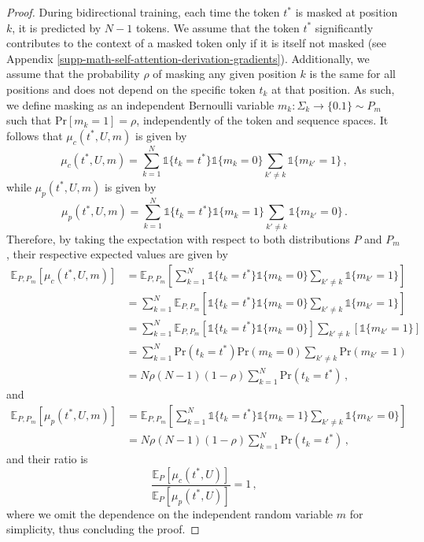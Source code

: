 \begin{proof}
During bidirectional training, each time the token $t^*$ is masked at position $k$, it is predicted by $N-1$ tokens.
%
We assume that the token $t^*$ significantly contributes to the context of a masked token only if it is itself not masked (see Appendix \ref{supp-math-self-attention-derivation-gradients}).
%
Additionally, we assume that the probability $\rho$ of masking any given position $k$ is the same for all positions and does not depend on the specific token $t_k$ at that position.
%
As such, we define masking as an independent Bernoulli variable $m_k: \Sigma_k \rightarrow \{0.1\} \sim P_m$ such that $\text{Pr}[m_k = 1] = \rho$, independently of the token and sequence spaces.
%
It follows that $\mu_c(t^*, U, m)$ is given by 
%
\begin{equation}
\mu_c(t^*, U, m) = \sum_{k=1}^N\mathds{1}\{t_k = t^*\} \mathds{1}\{m_k = 0\}\sum_{k' \neq k} \mathds{1}\{m_{k'} = 1\}  \,,
\end{equation}
%
while $\mu_p(t^*, U, m)$ is given by 
%
\begin{equation}
\mu_p(t^*, U, m) = \sum_{k=1}^N\mathds{1}\{t_k = t^*\} \mathds{1}\{m_{k} = 1\}\sum_{k' \neq k} \mathds{1}\{m_{k'} = 0\}\,.
\end{equation}
%
Therefore, by taking the expectation with respect to both distributions \( P \) and \( P_m \), their respective expected values are given by
%
\begin{equation}
\begin{split}
\mathbb{E}_{P,P_m}[\mu_c(t^*, U, m)] 
& =  \mathbb{E}_{P,P_m} \left[\sum_{k=1}^N\mathds{1}\{t_k = t^*\} \mathds{1}\{m_{k} = 0\}\sum_{k' \neq k} \mathds{1}\{m_{k'} = 1\} \right] \\
& = \sum_{k=1}^N \mathbb{E}_{P,P_m} \left[\mathds{1}\{t_k = t^*\} \mathds{1}\{m_{k} = 0\}\sum_{k' \neq k} \mathds{1}\{m_{k'} = 1\} \right]\\
& = \sum_{k=1}^N \mathbb{E}_{P,P_m} \left[\mathds{1}\{t_k = t^*\} \mathds{1}\{m_{k} = 0\}\right]\sum_{k' \neq k} \left[\mathds{1}\{m_{k'} = 1\} \right]\\
& = \sum_{k=1}^N \text{Pr}(t_k = t^*) \text{Pr}(m_{k} = 0)\sum_{k' \neq k} \text{Pr}(m_{k'} = 1) \\
& = N\rho(N-1)(1 - \rho) \sum_{k=1}^N \text{Pr}(t_k = t^*)\,,
\end{split}
\end{equation}
%
and
%
\begin{equation}
\begin{split}
\mathbb{E}_{P,P_m}[\mu_p(t^*, U, m)] 
& =  \mathbb{E}_{P,P_m} \left[\sum_{k=1}^N\mathds{1}\{t_k = t^*\} \mathds{1}\{m_{k} = 1\}\sum_{k' \neq k} \mathds{1}\{m_{k'} = 0\} \right] \\
& = N\rho(N-1)(1 - \rho)\sum_{k=1}^N \text{Pr}(t_k = t^*)  \,,
\end{split}
\end{equation}
%
and their ratio is
\begin{equation}
     \frac{\mathbb{E}_{P}[\mu_c(t^*, U)]}{\mathbb{E}_{P}[\mu_p(t^*, U)]} = 1 \,,
\end{equation}
%
where we omit the dependence on the independent random variable $m$ for simplicity, thus concluding the proof.
%
\end{proof}